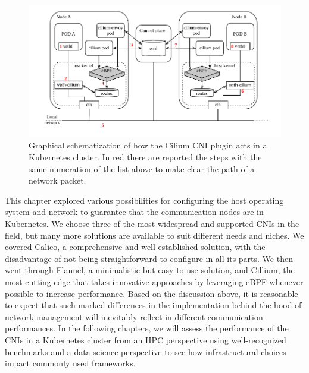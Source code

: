 \begin{figure}
  \centering
  \includegraphics[width=\textwidth]{img/chpt2/CNI-cilium}
  \caption{Graphical schematization of how the Cilium CNI plugin acts in a
    Kubernetes cluster. In red there are reported the steps with the same
    numeration of the list above to make clear the path of a network packet.}
  \label{fig:cni-cilium}
\end{figure}



This chapter explored various possibilities for configuring the host operating
system and network to guarantee that the communication nodes are in Kubernetes.
We choose three of the most widespread and supported CNIs in the field, but many
more solutions are available to suit different needs and niches. We covered
Calico, a comprehensive and well-established solution, with the disadvantage of
not being straightforward to configure in all its parts. We then went through
Flannel, a minimalistic but easy-to-use solution, and Cillium, the most
cutting-edge that takes innovative approaches by leveraging eBPF whenever
possible to increase performance. Based on the discussion above, it is
reasonable to expect that such marked differences in the implementation behind
the hood of network management will inevitably reflect in different
communication performances. In the following chapters, we will assess the
performance of the CNIs in a Kubernetes cluster from an HPC perspective using
well-recognized benchmarks and a data science perspective to see how
infrastructural choices impact commonly used frameworks.

